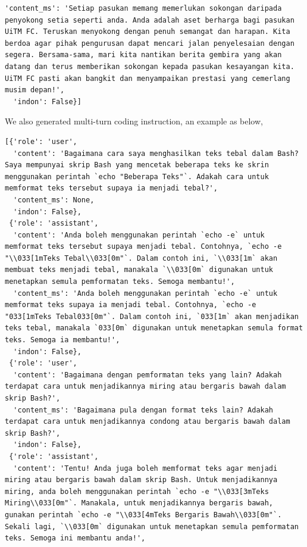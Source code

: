 \documentclass[preprint]{article}
\begin{document}
\begin{lstlisting}[breaklines=true]
  'content_ms': 'Setiap pasukan memang memerlukan sokongan daripada penyokong setia seperti anda. Anda adalah aset berharga bagi pasukan UiTM FC. Teruskan menyokong dengan penuh semangat dan harapan. Kita berdoa agar pihak pengurusan dapat mencari jalan penyelesaian dengan segera. Bersama-sama, mari kita nantikan berita gembira yang akan datang dan terus memberikan sokongan kepada pasukan kesayangan kita. UiTM FC pasti akan bangkit dan menyampaikan prestasi yang cemerlang musim depan!',
  'indon': False}]
\end{lstlisting}

We also generated multi-turn coding instruction, an example as below,

\begin{lstlisting}[breaklines=true]
  [{'role': 'user',
  'content': 'Bagaimana cara saya menghasilkan teks tebal dalam Bash? Saya mempunyai skrip Bash yang mencetak beberapa teks ke skrin menggunakan perintah `echo "Beberapa Teks"`. Adakah cara untuk memformat teks tersebut supaya ia menjadi tebal?',
  'content_ms': None,
  'indon': False},
 {'role': 'assistant',
  'content': 'Anda boleh menggunakan perintah `echo -e` untuk memformat teks tersebut supaya menjadi tebal. Contohnya, `echo -e "\\033[1mTeks Tebal\\033[0m"`. Dalam contoh ini, `\\033[1m` akan membuat teks menjadi tebal, manakala `\\033[0m` digunakan untuk menetapkan semula pemformatan teks. Semoga membantu!',
  'content_ms': 'Anda boleh menggunakan perintah `echo -e` untuk memformat teks supaya ia menjadi tebal. Contohnya, `echo -e "033[1mTeks Tebal033[0m"`. Dalam contoh ini, `033[1m` akan menjadikan teks tebal, manakala `033[0m` digunakan untuk menetapkan semula format teks. Semoga ia membantu!',
  'indon': False},
 {'role': 'user',
  'content': 'Bagaimana dengan pemformatan teks yang lain? Adakah terdapat cara untuk menjadikannya miring atau bergaris bawah dalam skrip Bash?',
  'content_ms': 'Bagaimana pula dengan format teks lain? Adakah terdapat cara untuk menjadikannya condong atau bergaris bawah dalam skrip Bash?',
  'indon': False},
 {'role': 'assistant',
  'content': 'Tentu! Anda juga boleh memformat teks agar menjadi miring atau bergaris bawah dalam skrip Bash. Untuk menjadikannya miring, anda boleh menggunakan perintah `echo -e "\\033[3mTeks Miring\\033[0m"`. Manakala, untuk menjadikannya bergaris bawah, gunakan perintah `echo -e "\\033[4mTeks Bergaris Bawah\\033[0m"`. Sekali lagi, `\\033[0m` digunakan untuk menetapkan semula pemformatan teks. Semoga ini membantu anda!',

\end{lstlisting}
\end{document}
